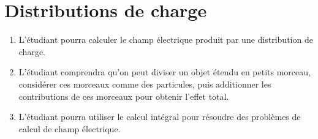 

\section{Distributions de charge}



\begin{enumerate}
  \item L'étudiant pourra calculer le champ électrique produit par une
    distribution de charge.
  \item L'étudiant comprendra qu'on peut diviser un objet étendu en petits
    morceau, considérer ces morceaux comme des particules, puis additionner les
    contributions de ces morceaux pour obtenir l'effet total.
  \item L'étudiant pourra utiliser le calcul intégral pour résoudre des
    problèmes de calcul de champ électrique.
\end{enumerate}


